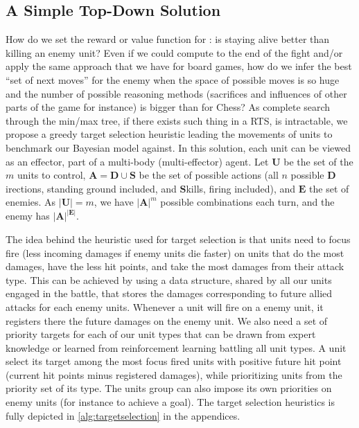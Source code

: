 \subsection{A Simple Top-Down Solution}
How do we set the reward or value function for : is staying alive better than killing an enemy unit? Even if we could compute to the end of the fight and/or apply the same approach that we have for board games, how do we infer the best ``set of next moves'' for the enemy when the space of possible moves is so huge and the number of possible reasoning methods (sacrifices and influences of other parts of the game for instance) is bigger than for Chess? As complete search through the min/max tree, if there exists such thing in a RTS, is intractable, we propose a greedy target selection heuristic leading the movements of units to benchmark our Bayesian model against. In this solution, each unit can be viewed as an effector, part of a multi-body (multi-effector) agent. 
Let $\mathbf{U}$ be the set of the $m$ units to control, $\mathbf{A} = \mathbf{D} \cup \mathbf{S}$ be the set of possible actions (all $n$ possible $\mathbf{D}$irections, standing ground included, and $\mathbf{S}$kills, firing included), and $\mathbf{E}$ the set of enemies. As $|\mathbf{U}| = m$, we have $|\mathbf{A}|^{m}$ possible combinations each turn, and the enemy has $|\mathbf{A}|^{|\mathbf{E}|}$. 
    
The idea behind the heuristic used for target selection is that units need to focus fire (less incoming damages if enemy units die faster) on units that do the most damages, have the less hit points, and take the most damages from their attack type. This can be achieved by using a data structure, shared by all our units engaged in the battle, that stores the damages corresponding to future allied attacks for each enemy units. Whenever a unit will fire on a enemy unit, it registers there the future damages on the enemy unit. We also need a set of priority targets for each of our unit types that can be drawn from expert knowledge or learned from reinforcement learning battling all unit types. A unit select its target among the most focus fired units with positive future hit point (current hit points minus registered damages), while prioritizing units from the priority set of its type. The units group can also impose its own priorities on enemy units (for instance to achieve a goal). The target selection heuristics is fully depicted in \ref{alg:targetselection} in the appendices.

